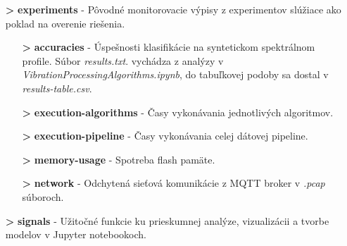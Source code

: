 \begin{itemize}[noitemsep]
\begin{itemize}
	\item[\textbf{>}] \textbf{experiments} - Pôvodné monitorovacie výpisy z experimentov slúžiace ako poklad na overenie riešenia.
		\begin{itemize}
			\item[\textbf{>}] \textbf{accuracies} - Úspešnosti klasifikácie na syntetickom spektrálnom profile. Súbor \emph{results.txt}.
			vychádza z analýzy v \emph{VibrationProcessingAlgorithms.ipynb}, do tabuľkovej podoby sa dostal v \emph{results-table.csv}.
			\item[\textbf{>}] \textbf{execution-algorithms} - Časy vykonávania jednotlivých algoritmov.
			\item[\textbf{>}] \textbf{execution-pipeline} - Časy vykonávania celej dátovej pipeline.
			\item[\textbf{>}] \textbf{memory-usage} - Spotreba flash pamäte.
			\item[\textbf{>}] \textbf{network} - Odchytená sieťová komunikácie z MQTT broker v \emph{.pcap} súboroch.
		\end{itemize}
	\item[\textbf{>}] \textbf{signals} - Užitočné funkcie ku prieskumnej analýze, vizualizácii a tvorbe modelov v Jupyter notebookoch.	
	\end{itemize}
\end{itemize}
